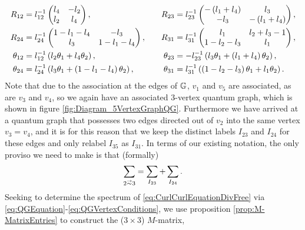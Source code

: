 \begin{align*}
	R_{12} &= l_{12}^{-1}
	\begin{pmatrix}
		l_4 & -l_2 \\ 
		l_2 & l_4
	\end{pmatrix},
	&\quad
	R_{23} &= l_{23}^{-1}
	\begin{pmatrix}
		-\left( l_1+l_4 \right) & l_3 \\
		-l_3 & -\left( l_1+l_4 \right)
	\end{pmatrix},
	\\
	R_{24} &= l_{24}^{-1}
	\begin{pmatrix}
		1-l_1-l_4 & -l_3 \\
		l_3 & 1-l_1-l_4
	\end{pmatrix},
	&\quad
	R_{31} &= l_{31}^{-1}
	\begin{pmatrix}
		l_1 & l_2+l_3-1 \\
		1-l_2-l_3 & l_1
	\end{pmatrix},
	\\
	\theta_{12} &= l_{12}^{-1}\left( l_2\theta_1 + l_4\theta_2 \right),
	&\quad \theta_{23} &= -l_{23}^{-1}\left( l_3\theta_1 + \left( l_1+l_4 \right)\theta_2 \right), \\
	\theta_{24} &= l_{24}^{-1}\left( l_3\theta_1 + \left( 1-l_1-l_4 \right)\theta_2 \right),
	&\quad \theta_{31} &= l_{31}^{-1}\left( \left( 1-l_2-l_3 \right)\theta_1 + l_1\theta_2 \right).
\end{align*}
Note that due to the association at the edges of $\mathbb{G}$, $v_1$ and $v_5$ are associated, as are $v_3$ and $v_4$, so we again have an associated 3-vertex quantum graph, which is shown in figure \ref{fig:Diagram_5VertexGraphQG}.
Furthermore we have arrived at a quantum graph that possesses two edges directed out of $v_2$ into the same vertex $v_3=v_4$, and it is for this reason that we keep the distinct labels $I_{23}$ and $I_{24}$ for these edges and only relabel $I_{35}$ as $I_{31}$.
In terms of our existing notation, the only proviso we need to make is that (formally)
\begin{align*}
	\sum_{2\conLeft 3} = \sum_{I_{23}} + \sum_{I_{24}}.
\end{align*}
Seeking to determine the spectrum of \eqref{eq:CurlCurlEquationDivFree} via \eqref{eq:QGEquation}-\eqref{eq:QGVertexConditions}, we use proposition \ref{prop:M-MatrixEntries} to construct the ($3\times3$) $M$-matrix,
